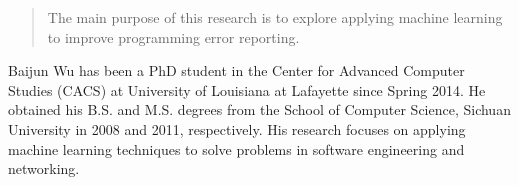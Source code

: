 \documentclass[12pt]{report}	%
\begin{document}
%
%


                      
%


%
% 
%
\printindex     %
%

\begin{abstract}

The main purpose of this research is to explore applying 
machine learning to improve programming error reporting.
%


\end{abstract}

\begin{biography}

Baijun Wu has been a PhD student in the Center for Advanced
Computer Studies (CACS) at University of Louisiana at Lafayette since Spring 2014.
He obtained his B.S. and M.S. degrees from the School of Computer Science,
Sichuan University in 2008 and 2011, respectively.
His research focuses on applying machine learning techniques to solve
problems in software engineering and networking.

\end{biography}
\end{document}
